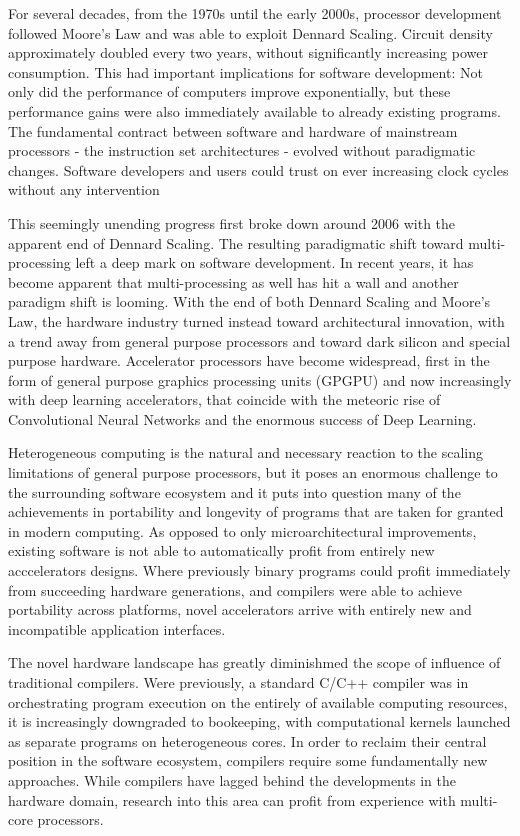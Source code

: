     For several decades, from the 1970s until the early 2000s, processor
    development followed Moore's Law and was able to exploit Dennard Scaling.
    Circuit density approximately doubled every two years, without significantly
    increasing power consumption.
    This had important implications for software development: Not only did the
    performance of computers improve exponentially, but these performance gains
    were also immediately available to already existing programs.
    The fundamental contract between software and hardware of mainstream
    processors - the instruction set architectures - evolved without
    paradigmatic changes.
    Software developers and users could trust on ever increasing clock cycles
    without any intervention

    This seemingly unending progress first broke down around 2006 with the
    apparent end of Dennard Scaling.
    The resulting paradigmatic shift toward multi-processing left a deep mark on
    software development.
    In recent years, it has become apparent that multi-processing as well has
    hit a wall and another paradigm shift is looming.
    With the end of both Dennard Scaling and Moore's Law, the hardware industry
    turned instead toward architectural innovation, with a trend away from
    general purpose processors and toward dark silicon and special purpose
    hardware.
    Accelerator processors have become widespread, first in the form of general
    purpose graphics processing units (GPGPU) and now increasingly with deep
    learning accelerators, that coincide with the meteoric rise of Convolutional
    Neural Networks and the enormous success of Deep Learning.

    Heterogeneous computing is the natural and necessary reaction to the scaling
    limitations of general purpose processors, but it poses an enormous
    challenge to the surrounding software ecosystem and it puts into question
    many of the achievements in portability and longevity of programs that are
    taken for granted in modern computing.
    As opposed to only microarchitectural improvements, existing software is not
    able to automatically profit from entirely new acccelerators designs.
    Where previously binary programs could profit immediately from succeeding
    hardware generations, and compilers were able to achieve portability across
    platforms, novel accelerators arrive with entirely new and incompatible
    application interfaces.

    The novel hardware landscape has greatly diminishmed the scope of influence
    of traditional compilers.
    Were previously, a standard C/C++ compiler was in orchestrating program
    execution on the entirely of available computing resources, it is
    increasingly downgraded to bookeeping, with computational kernels launched
    as separate programs on heterogeneous cores.
    In order to reclaim their central position in the software ecosystem,
    compilers require some fundamentally new approaches.
    While compilers have lagged behind the developments in the hardware domain,
    research into this area can profit from experience with multi-core
    processors.

